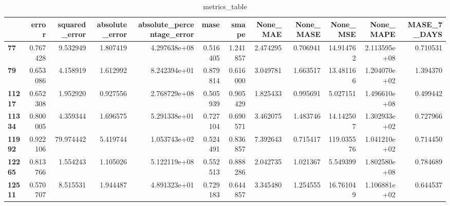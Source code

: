 \begin{table}[h]
\centering
\caption{metrics_table}
\label{table:PRedict high-variance dataset with lstm}
\begin{tabular}{lrrrrrrrrrrr}
\toprule
{} &     error &  squared\_error &  absolute\_error &  absolute\_percentage\_error &      mase &     smape &  None\_MAE &  None\_MASE &    None\_MSE &     None\_MAPE &  MASE\_7\_DAYS \\
\midrule
\textbf{77   } &  0.767428 &       9.532949 &        1.807419 &               4.297638e+08 &  0.516405 &  1.241857 &  2.474295 &   0.706941 &   14.914762 &  2.113595e+08 &     0.710531 \\
\textbf{79   } &  0.653086 &       4.158919 &        1.612992 &               8.242394e+01 &  0.879814 &  0.616000 &  3.049781 &   1.663517 &   13.481166 &  1.204070e+02 &     1.394370 \\
\textbf{11217} &  0.652308 &       1.952920 &        0.927556 &               2.768729e+08 &  0.505939 &  0.905429 &  1.825433 &   0.995691 &    5.027151 &  1.496610e+08 &     0.499442 \\
\textbf{11334} &  0.800005 &       4.359344 &        1.696575 &               5.291338e+01 &  0.727104 &  0.690571 &  3.462075 &   1.483746 &   14.142507 &  1.302933e+02 &     0.727966 \\
\textbf{11992} &  0.922106 &      79.974442 &        5.419744 &               1.053743e+02 &  0.524491 &  0.836857 &  7.392643 &   0.715417 &  119.035576 &  1.041210e+02 &     0.714450 \\
\textbf{12265} &  0.813766 &       1.554243 &        1.105026 &               5.122119e+08 &  0.552513 &  0.888286 &  2.042735 &   1.021367 &    5.549399 &  1.802580e+08 &     0.784689 \\
\textbf{12511} &  0.570707 &       8.515531 &        1.944487 &               4.891323e+01 &  0.729183 &  0.644857 &  3.345480 &   1.254555 &   16.761049 &  1.106881e+02 &     0.644537 \\
\bottomrule
\end{tabular}
\end{table}
